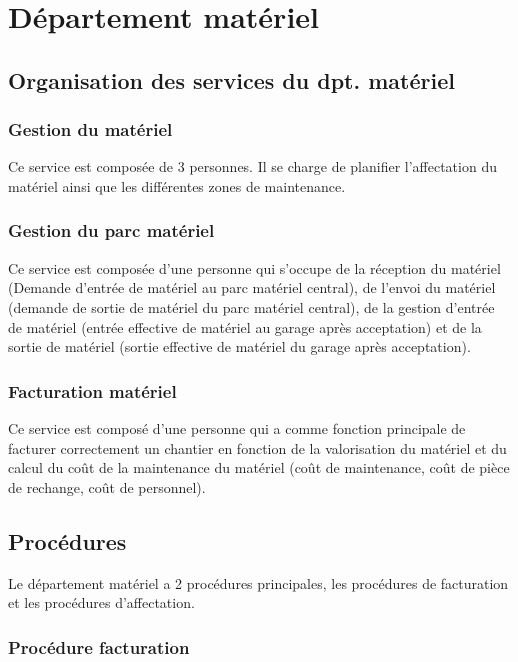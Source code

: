 \section{Département matériel}

\subsection{Organisation des services du dpt. matériel}


	\subsubsection{Gestion du matériel}

	Ce service est composée de 3 personnes. Il se charge de planifier
    l'affectation du matériel ainsi que les différentes zones de
    maintenance.
	
	\subsubsection{Gestion du parc matériel}
	
	Ce service est composée d'une personne qui s'occupe de la réception
    du matériel (Demande d'entrée de matériel au parc matériel central),
    de l'envoi du matériel (demande de sortie de matériel du parc matériel
    central), de la gestion d'entrée de matériel (entrée effective de
    matériel au garage après acceptation) et de la sortie de matériel
    (sortie effective de matériel du garage après acceptation).
		
	\subsubsection{Facturation matériel}
	Ce service est composé d'une personne qui a comme fonction principale de
    facturer correctement un chantier en fonction de la valorisation du
    matériel et du calcul du coût de la maintenance du matériel (coût de 
    maintenance, coût de pièce de rechange, coût de personnel).
	
\subsection{Procédures}
	
    Le département matériel a 2 procédures principales, les procédures de
    facturation et les procédures d'affectation.

\subsubsection{Procédure facturation}

